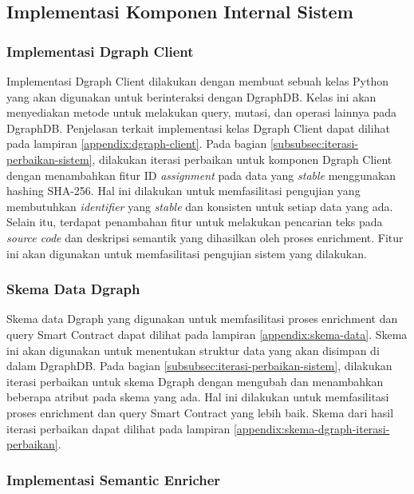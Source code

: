 \subsection{Implementasi Komponen Internal Sistem}

\subsubsection{Implementasi Dgraph Client}

Implementasi Dgraph Client dilakukan dengan membuat sebuah kelas Python yang akan digunakan untuk berinteraksi dengan DgraphDB. Kelas ini akan menyediakan metode untuk melakukan query, mutasi, dan operasi lainnya pada DgraphDB. Penjelasan terkait implementasi kelas Dgraph Client dapat dilihat pada lampiran \ref{appendix:dgraph-client}. Pada bagian \ref{subsubsec:iterasi-perbaikan-sistem}, dilakukan iterasi perbaikan untuk komponen Dgraph Client dengan menambahkan fitur ID \textit{assignment} pada data yang \textit{stable} menggunakan hashing SHA-256. Hal ini dilakukan untuk memfasilitasi pengujian yang membutuhkan \textit{identifier} yang \textit{stable} dan konsisten untuk setiap data yang ada. Selain itu, terdapat penambahan fitur untuk melakukan pencarian teks pada \textit{source code} dan deskripsi semantik yang dihasilkan oleh proses enrichment. Fitur ini akan digunakan untuk memfasilitasi pengujian sistem yang dilakukan.

\subsubsection{Skema Data Dgraph}

Skema data Dgraph yang digunakan untuk memfasilitasi proses enrichment dan query Smart Contract dapat dilihat pada lampiran \ref{appendix:skema-data}. Skema ini akan digunakan untuk menentukan struktur data yang akan disimpan di dalam DgraphDB. Pada bagian \ref{subsubsec:iterasi-perbaikan-sistem}, dilakukan iterasi perbaikan untuk skema Dgraph dengan mengubah dan menambahkan beberapa atribut pada skema yang ada. Hal ini dilakukan untuk memfasilitasi proses enrichment dan query Smart Contract yang lebih baik. Skema dari hasil iterasi perbaikan dapat dilihat pada lampiran \ref{appendix:skema-dgraph-iterasi-perbaikan}.

\subsubsection{Implementasi Semantic Enricher}

